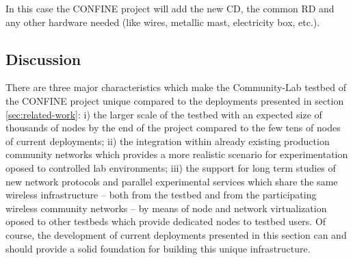 \documentclass[conference]{IEEEtran}
\begin{document}
In this case the CONFINE project will add the new CD, the common RD and any other hardware needed (like wires,
metallic mast, electricity box, etc.).








\subsection{Discussion}

There are three major characteristics which make the Community-Lab
testbed of the CONFINE project unique compared to the deployments presented in section \ref{sec:related-work}: i) the 
larger scale of the testbed with an expected size of thousands of nodes by the end of the project compared to the few tens
of nodes of current deployments; ii) the integration within already existing production community networks which provides
a more realistic scenario for experimentation oposed to controlled lab environments; iii) the support for long term studies
of new network protocols and parallel experimental services which share the same wireless infrastructure -- both from the testbed and from the participating wireless community networks -- by means of
node and network virtualization oposed to other testbeds which provide dedicated nodes to testbed users.
Of course, the development of current deployments presented in this section can and should provide a solid foundation for building
this unique infrastructure.
\end{document}
